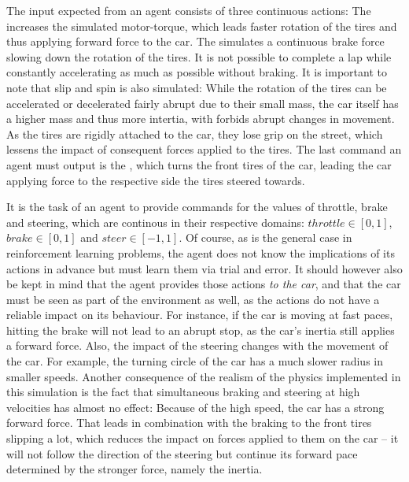 The input expected from an agent consists of three continuous actions: The  increases the simulated motor-torque, which leads faster rotation of the tires and thus applying forward force to the car. The  simulates a continuous brake force slowing down the rotation of the tires. It is not possible to complete a lap while constantly accelerating as much as possible without braking. It is important to note that slip and spin is also simulated: While the rotation of the tires can be accelerated or decelerated fairly abrupt due to their small mass, the car itself has a higher mass and thus more intertia, with forbids abrupt changes in movement. As the tires are rigidly attached to the car, they lose grip on the street, which lessens the impact of consequent forces applied to the tires. The last command an agent must output is the , which turns the front tires of the car, leading the car applying force to the respective side the tires steered towards.

It is the task of an agent to provide commands for the values of throttle, brake and steering, which are continous in their respective domains: $throttle \in [0,1]$, $brake \in [0,1]$ and $steer \in[-1,1]$. Of course, as is the general case in reinforcement learning problems, the agent does not know the implications of its actions in advance but must learn them via trial and error. It should however also be kept in mind that the agent provides those actions \textit{to the car}, and that the car must be seen as part of the environment as well, as the actions do not have a reliable impact on its behaviour. For instance, if the car is moving at fast paces, hitting the brake will not lead to an abrupt stop, as the car's inertia still applies a forward force. %
Also, the impact of the steering changes with the movement of the car. For example, the turning circle of the car has a much slower radius in smaller speeds. Another consequence of the realism of the physics implemented in this simulation is the fact that simultaneous braking and steering at high velocities has almost no effect: Because of the high speed, the car has a strong forward force. That leads in combination with the braking to the front tires slipping a lot, which reduces the impact on forces applied to them on the car -- it will not follow the direction of the steering but continue its forward pace determined by the stronger force, namely the inertia.

